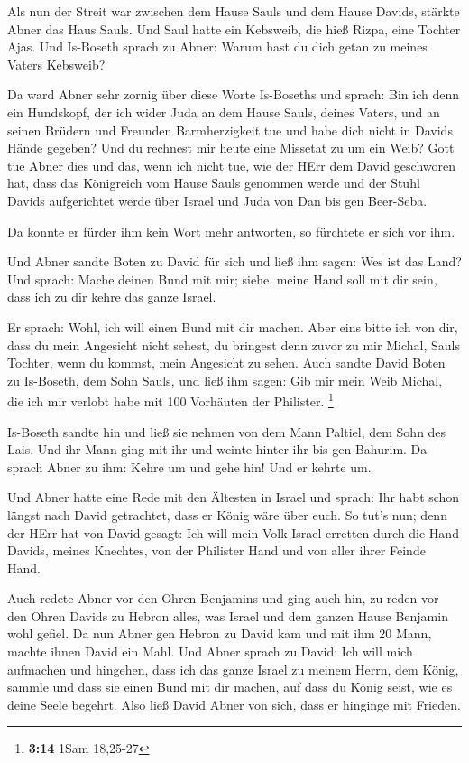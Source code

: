  Als nun der Streit war zwischen dem Hause Sauls und dem
Hause Davids, stärkte Abner das Haus Sauls.  Und Saul hatte
ein Kebsweib, die hieß Rizpa, eine Tochter Ajas. Und Is-Boseth sprach zu
Abner: Warum hast du dich getan zu meines Vaters Kebsweib?

 Da ward Abner sehr zornig über diese Worte Is-Boseths und
sprach: Bin ich denn ein Hundskopf, der ich wider Juda an dem Hause
Sauls, deines Vaters, und an seinen Brüdern und Freunden Barmherzigkeit
tue und habe dich nicht in Davids Hände gegeben? Und du rechnest mir
heute eine Missetat zu um ein Weib?  Gott tue Abner dies und
das, wenn ich nicht tue, wie der HErr dem David geschworen hat,
 dass das Königreich vom Hause Sauls genommen werde und der
Stuhl Davids aufgerichtet werde über Israel und Juda von Dan bis gen
Beer-Seba.

 Da konnte er fürder ihm kein Wort mehr antworten, so
fürchtete er sich vor ihm.

 Und Abner sandte Boten zu David für sich und ließ ihm
sagen: Wes ist das Land? Und sprach: Mache deinen Bund mit mir; siehe,
meine Hand soll mit dir sein, dass ich zu dir kehre das ganze Israel.

 Er sprach: Wohl, ich will einen Bund mit dir machen. Aber
eins bitte ich von dir, dass du mein Angesicht nicht sehest, du bringest
denn zuvor zu mir Michal, Sauls Tochter, wenn du kommst, mein Angesicht
zu sehen.  Auch sandte David Boten zu Is-Boseth, dem Sohn
Sauls, und ließ ihm sagen: Gib mir mein Weib Michal, die ich mir verlobt
habe mit 100 Vorhäuten der Philister. \footnote{\textbf{3:14} 1Sam
  18,25-27}

 Is-Boseth sandte hin und ließ sie nehmen von dem Mann
Paltiel, dem Sohn des Lais.  Und ihr Mann ging mit ihr und
weinte hinter ihr bis gen Bahurim. Da sprach Abner zu ihm: Kehre um und
gehe hin! Und er kehrte um.

 Und Abner hatte eine Rede mit den Ältesten in Israel und
sprach: Ihr habt schon längst nach David getrachtet, dass er König wäre
über euch.  So tut's nun; denn der HErr hat von David
gesagt: Ich will mein Volk Israel erretten durch die Hand Davids, meines
Knechtes, von der Philister Hand und von aller ihrer Feinde Hand.

 Auch redete Abner vor den Ohren Benjamins und ging auch
hin, zu reden vor den Ohren Davids zu Hebron alles, was Israel und dem
ganzen Hause Benjamin wohl gefiel.  Da nun Abner gen Hebron
zu David kam und mit ihm 20 Mann, machte ihnen David ein Mahl.
 Und Abner sprach zu David: Ich will mich aufmachen und
hingehen, dass ich das ganze Israel zu meinem Herrn, dem König, sammle
und dass sie einen Bund mit dir machen, auf dass du König seist, wie es
deine Seele begehrt. Also ließ David Abner von sich, dass er hinginge
mit Frieden.

